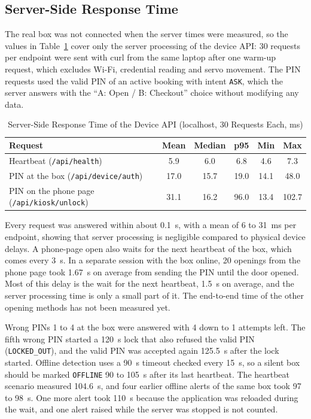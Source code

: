 \subsection{Server-Side Response Time}
\label{sec:latency}

The real box was not connected when the server times were measured, so the values in Table~\ref{tab:latency} cover
only the server processing of the device API: 30 requests per endpoint were sent with curl from the same laptop after
one warm-up request, which excludes Wi-Fi, credential reading and servo movement. The PIN requests used the valid PIN
of an active booking with intent \texttt{ASK}, which the server answers with the ``A: Open / B: Checkout'' choice without
modifying any data.

\begin{table}[!htbp]
\renewcommand{\arraystretch}{1.1}
\centering
\small
\caption{Server-Side Response Time of the Device API (localhost, 30 Requests Each, ms)}
\label{tab:latency}
\begin{tabular}{l c c c c c}
\hline
Request & Mean & Median & p95 & Min & Max \\
\hline
Heartbeat (\texttt{/api/health})                   & 5.9  & 6.0  & 6.8  & 4.6  & 7.3 \\
PIN at the box (\texttt{/api/device/auth})         & 17.0 & 15.7 & 19.0 & 14.1 & 48.0 \\
PIN on the phone page (\texttt{/api/kiosk/unlock}) & 31.1 & 16.2 & 96.0 & 13.4 & 102.7 \\
\hline
\end{tabular}
\end{table}

Every request was answered within about 0.1~s, with a mean of 6 to 31~ms per endpoint, showing that server processing
is negligible compared to physical device delays. A phone-page open also waits for the next heartbeat of the box, which
comes every 3~s. In a separate session with the box online, 20 openings from the phone page took 1.67~s on average
from sending the PIN until the door opened. Most of this delay is the wait for the next heartbeat, 1.5~s on average,
and the server processing time is only a small part of it. The end-to-end time of the other opening methods has not
been measured yet.

Wrong PINs 1 to 4 at the box were answered with 4 down to 1 attempts left. The fifth wrong PIN started a 120~s lock
that also refused the valid PIN (\texttt{LOCKED\_OUT}), and the valid PIN was accepted again 125.5~s after the lock
started. Offline detection uses a 90~s timeout checked every 15~s, so a silent box should be marked \texttt{OFFLINE}
90 to 105~s after its last heartbeat. The heartbeat scenario measured 104.6~s, and four earlier offline alerts of the
same box took 97 to 98~s. One more alert took 110~s because the application was reloaded during the wait, and one alert
raised while the server was stopped is not counted.

